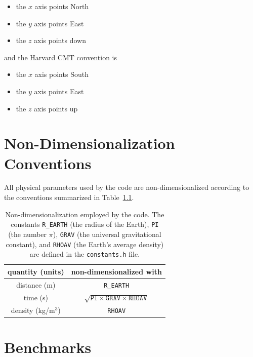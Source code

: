 \documentclass[oneside,english]{book}
\providecommand{\tabularnewline}{\\}
\begin{document}
\begin{itemize}
\item the $x$ axis points North
\item the $y$ axis points East
\item the $z$ axis points down
\end{itemize}
and the Harvard CMT convention is

\begin{itemize}
\item the $x$ axis points South
\item the $y$ axis points East
\item the $z$ axis points up
\end{itemize}

\chapter{\label{cha:Non-Dimensionalization-Conventions}Non-Dimensionalization
Conventions{\small{} }}

All physical parameters used by the code are non-dimensionalized according
to the conventions summarized in Table~{\small \ref{table:conventions}.
}%
\begin{table}[ht]
\noindent \begin{centering}
{\small }\begin{tabular}{|c|c|}
\hline
quantity (units)  & non-dimensionalized with \tabularnewline
\hline
distance (m)  & \texttt{R\_EARTH} \tabularnewline
time (s)  & $\sqrt{\texttt{PI}\times\texttt{GRAV}\times\texttt{RHOAV}}$ \tabularnewline
density (kg/m$^{3}$)  & \texttt{RHOAV} \tabularnewline
\hline
\end{tabular}
\par\end{centering}{\small \par}

\caption{Non-dimensionalization employed by the code. The constants \texttt{R\_EARTH}
(the radius of the Earth), \texttt{PI} (the number $\pi$), \texttt{GRAV}
(the universal gravitational constant), and \texttt{RHOAV} (the Earth's
average density) are defined in the \texttt{constants.h} file. }


{\small \label{table:conventions} }
\end{table}
{\small \par}


\chapter{Benchmarks}
\end{document}
